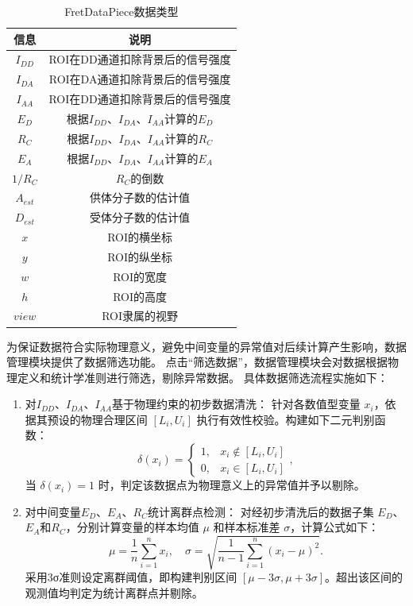 \begin{table}[htbp]
  \centering
  \caption{FretDataPiece数据类型}
  \label{tab:数据项内容定义}
    \begin{tabular}{cc}
      \toprule[1.5pt]
      {信息} & {说明} \\
      \midrule
      $I_{DD}$ & ROI在DD通道扣除背景后的信号强度 \\
      $I_{DA}$ & ROI在DA通道扣除背景后的信号强度 \\
      $I_{AA}$ & ROI在DD通道扣除背景后的信号强度 \\
      $E_D$ & 根据$I_{DD}$、$I_{DA}$、$I_{AA}$计算的$E_D$ \\
      $R_C$ & 根据$I_{DD}$、$I_{DA}$、$I_{AA}$计算的$R_C$ \\
      $E_A$ & 根据$I_{DD}$、$I_{DA}$、$I_{AA}$计算的$E_A$ \\
      $1/R_C$ & $R_C$的倒数 \\
      $A_{est}$ & 供体分子数的估计值 \\
      $D_{est}$ & 受体分子数的估计值 \\
      $x$ & ROI的横坐标 \\
      $y$ & ROI的纵坐标 \\
      $w$ & ROI的宽度 \\
      $h$ & ROI的高度 \\
      $view$ & ROI隶属的视野\\
      \bottomrule[1.5pt]
    \end{tabular}
\end{table}

为保证数据符合实际物理意义，避免中间变量的异常值对后续计算产生影响，数据管理模块提供了数据筛选功能。
点击“筛选数据”，数据管理模块会对数据根据物理定义和统计学准则进行筛选，剔除异常数据。
具体数据筛选流程实施如下：
\begin{enumerate}
  \item 对$I_{DD}$、$I_{DA}$、$I_{AA}$基于物理约束的初步数据清洗：
    针对各数值型变量 \( x_i \)，依据其预设的物理合理区间 \( [L_i, U_i] \) 执行有效性校验。构建如下二元判别函数：
    \begin{equation}
      \delta(x_i) = 
      \begin{cases} 
        1, & x_i \notin [L_i, U_i]  \\
        0, & x_i \in [L_i, U_i]
      \end{cases} ,
    \end{equation}
    当 \( \delta(x_i) = 1 \) 时，判定该数据点为物理意义上的异常值并予以剔除。
  \item 对中间变量$E_D$、$E_A$、$R_C$统计离群点检测：
    对经初步清洗后的数据子集 \( E_D \)、\( E_A \)和$R_C$，分别计算变量的样本均值 \( \mu \) 和样本标准差 \( \sigma \)，计算公式如下：
    \begin{equation}
      \mu = \frac{1}{n}\sum_{i=1}^n x_i, \quad \sigma = \sqrt{\frac{1}{n - 1}\sum_{i=1}^n (x_i - \mu)^2}.
    \end{equation}
    采用3σ准则设定离群阈值，即构建判别区间 \( [\mu - 3\sigma, \mu + 3\sigma] \)。超出该区间的观测值均判定为统计离群点并剔除。
\end{enumerate}

